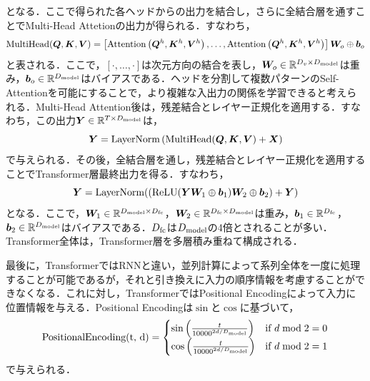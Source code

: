 \documentclass[12pt]{jarticle}
\numberwithin{equation}{section}    %
\numberwithin{figure}{section}      %
\numberwithin{table}{section}      %
\begin{document}
となる．ここで得られた各ヘッドからの出力を結合し，さらに全結合層を通すことでMulti-Head Attetionの出力が得られる．すなわち，
\begin{equation}
    \text{MultiHead}(\bm{Q}, \bm{K}, \bm{V}) = \left[\text{Attention}\left(\bm{Q}^{h}, \bm{K}^{h}, \bm{V}^{h}\right), \ldots, \text{Attention}\left(\bm{Q}^{h}, \bm{K}^{h}, \bm{V}^{h}\right)\right] \bm{W}_{o} \oplus \bm{b}_{o}
\end{equation}
と表される．ここで，$[\cdot, \ldots, \cdot]$は次元方向の結合を表し，$\bm{W}_{o} \in \mathbb{R}^{D_{v} \times D_{\text{model}}}$は重み，$\bm{b}_{o} \in \mathbb{R}^{D_{\text{model}}}$はバイアスである．ヘッドを分割して複数パターンのSelf-Attentionを可能にすることで，より複雑な入出力の関係を学習できると考えられる．Multi-Head Attention後は，残差結合とレイヤー正規化を適用する．すなわち，この出力$\bm{Y} \in \mathbb{R}^{T \times D_{\text{model}}}$は，
\begin{equation}
    \bm{Y} = \text{LayerNorm}\left(\text{MultiHead}(\bm{Q}, \bm{K}, \bm{V}) + \bm{X}\right)
\end{equation}
で与えられる．その後，全結合層を通し，残差結合とレイヤー正規化を適用することでTransformer層最終出力を得る．すなわち，
\begin{equation}
    \bm{Y} = \text{LayerNorm}((\text{ReLU}(\bm{Y}\bm{W}_{1} \oplus \bm{b}_{1})\bm{W}_{2} \oplus \bm{b}_{2}) + \bm{Y})
\end{equation}
となる．ここで，$\bm{W}_{1} \in \mathbb{R}^{D_{\text{model}} \times D_{\text{fc}}}$，$\bm{W}_{2} \in \mathbb{R}^{D_{\text{fc}} \times D_{\text{model}}}$は重み，$\bm{b}_{1} \in \mathbb{R}^{D_{\text{fc}}}$，$\bm{b}_{2} \in \mathbb{R}^{D_{\text{model}}}$はバイアスである．$D_{\text{fc}}$は$D_{\text{model}}$の4倍とされることが多い．Transformer全体は，Transformer層を多層積み重ねて構成される．

最後に，TransformerではRNNと違い，並列計算によって系列全体を一度に処理することが可能であるが，それと引き換えに入力の順序情報を考慮することができなくなる．これに対し，TransformerではPositional Encodingによって入力に位置情報を与える．Positional Encodingは$\sin$と$\cos$に基づいて，
\begin{equation}
    \text{PositionalEncoding(t, d)} =
    \begin{cases}
        \sin \left(\frac{t}{10000^{2d / D_{\text{model}}}}\right) & \text{if $d \bmod 2 = 0$} \\
        \cos \left(\frac{t}{10000^{2d / D_{\text{model}}}}\right) & \text{if $d \bmod 2 = 1$}
    \end{cases}
\end{equation}
で与えられる．
\end{document}
